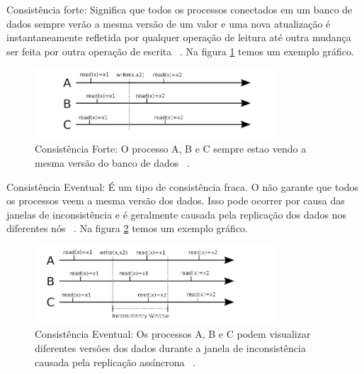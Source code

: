 Consistência forte: Significa que todos os processos conectados em um banco de dados sempre verão a mesma versão de um valor e uma nova atualização é instantaneamente refletida por qualquer operação de leitura até outra mudança ser feita por outra operação de escrita ~\cite{Orendanalysisand}. Na figura \ref{fig:strongconsistency} temos um exemplo gráfico.

	\begin{figure}[!htbp]
		\begin{center}
			\includegraphics[width=0.8\textwidth]{strongconsistency}
		\end{center}
		\caption{Consistência Forte: O processo A, B e C sempre estao vendo a mesma versão do banco de dados ~\cite{Orendanalysisand}.}
		\label{fig:strongconsistency}
	\end{figure}

Consistência Eventual: É um tipo de consistência fraca. O não garante que todos os processos veem a mesma versão dos dados. Isso pode ocorrer por causa das janelas de inconsistência e é geralmente causada pela replicação dos dados nos diferentes nós ~\cite{Orendanalysisand}. Na figura \ref{fig:eventualconsistency} temos um exemplo gráfico.

	\begin{figure}[!htbp]
		\begin{center}
			\includegraphics[width=0.8\textwidth]{eventualconsistency}
		\end{center}
		\caption{Consistência Eventual: Os processos A, B e C podem visualizar diferentes versões dos dados durante a janela de inconsistência causada pela replicação assíncrona ~\cite{Orendanalysisand}.}
		\label{fig:eventualconsistency}
	\end{figure}







